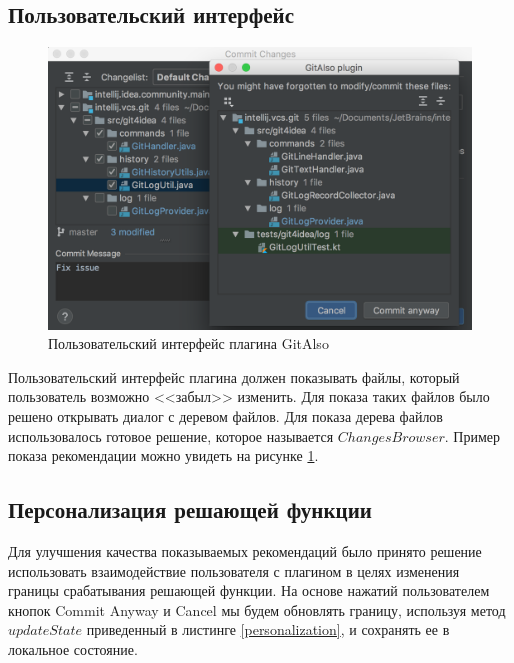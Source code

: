 \subsection{Пользовательский интерфейс}\label{git-also-ui}
\begin{figure}[!h]
\caption{Пользовательский интерфейс плагина GitAlso}\label{git-also-screen}
\centering
\includegraphics[scale=0.6]{images/GitAlso.png}
\end{figure}
Пользовательский интерфейс плагина должен показывать файлы, который пользователь возможно <<забыл>> изменить. Для показа таких файлов было решено открывать диалог с деревом файлов. Для показа дерева файлов использовалось готовое решение, которое называется $ChangesBrowser$. Пример показа рекомендации можно увидеть на рисунке  \ref{git-also-screen}.
\subsection{Персонализация решающей функции}
Для улучшения качества показываемых рекомендаций было принято решение использовать взаимодействие пользователя с плагином в целях изменения границы срабатывания решающей функции. На основе нажатий пользователем кнопок Commit Anyway и Cancel мы будем обновлять границу, используя метод $updateState$ приведенный в листинге \ref{personalization}, и сохранять ее в локальное состояние.
